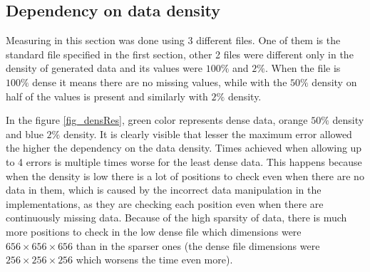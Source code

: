 \subsection{Dependency on data density}
Measuring in this section was done using 3 different files. One of them is the standard file specified in the first section, other 2 files were different only in the density of generated data and its values were $100 \%$ and $2 \%$. When the file is $100 \%$ dense it means there are no missing values, while with the $50 \%$ density on half of the values is present and similarly with $2 \%$ density.

In the figure \ref{fig_densRes}, green color represents dense data, orange $50 \%$ density and blue $2 \%$ density. It is clearly visible that lesser the maximum error allowed the higher the dependency on the data density. Times achieved when allowing up to 4 errors is multiple times worse for the least dense data. This happens because when the density is low there is a lot of positions to check even when there are no data in them, which is caused by the incorrect data manipulation in the implementations, as they are checking each position even when there are continuously missing data. Because of the high sparsity of data, there is much more positions to check in the low dense file which dimensions were $656\times 656 \times 656$ than in the sparser ones (the dense file dimensions were $256\times 256 \times 256$ which worsens the time even more).

